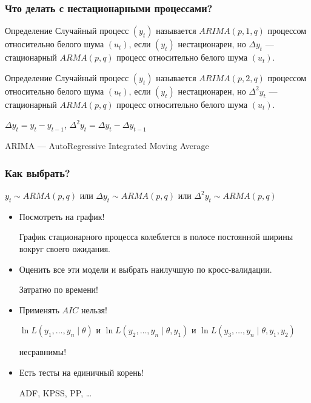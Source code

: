\begin{frame}
  \frametitle{Что делать с нестационарными процессами?}

  \begin{block}{Определение}
    Случайный процесс $(y_t)$ называется $ARIMA(p, 1, q)$ процессом относительно белого шума $(u_t)$, 
    если $(y_t)$ нестационарен, но $\Delta y_t$ — стационарный $ARMA(p, q)$ процесс относительно белого шума $(u_t)$.  
  \end{block}

  \pause

  \begin{block}{Определение}
    Случайный процесс $(y_t)$ называется $ARIMA(p, 2, q)$ процессом относительно белого шума $(u_t)$, 
    если $(y_t)$ нестационарен, но $\Delta^2 y_t$ — стационарный $ARMA(p, q)$ процесс относительно белого шума $(u_t)$.  
  \end{block}

  \pause
  $\Delta y_t = y_t - y_{t-1}$, $\Delta^2 y_t = \Delta y_t - \Delta y_{t-1}$

  \pause 
  ARIMA — \alert{A}uto\alert{R}egressive \alert{I}ntegrated \alert{M}oving \alert{A}verage
  
\end{frame}

\begin{frame}
  \frametitle{Как выбрать?}
  
  $y_t \sim ARMA(p, q)$ или $\Delta y_t \sim ARMA(p, q)$ или $\Delta^2 y_t \sim ARMA(p, q)$
\pause
  \begin{itemize}[<+->]
    \item Посмотреть на график!
    
    \pause График стационарного процесса колеблется в полосе постоянной ширины вокруг своего ожидания.

    \item Оценить все эти модели и выбрать наилучшую по кросс-валидации.
    
    \pause Затратно по времени!

    \item Применять $AIC$ нельзя!
    
    \pause $\ln L(y_1, \ldots, y_n \mid \theta)$ и $\ln L(y_2, \ldots, y_n \mid \theta, y_1)$ и $\ln L(y_3, \ldots, y_n \mid \theta, y_1, y_2)$

    несравнимы!
    \item Есть тесты на единичный корень!
    
    \pause ADF, KPSS, PP, \ldots
  \end{itemize}

\end{frame}

